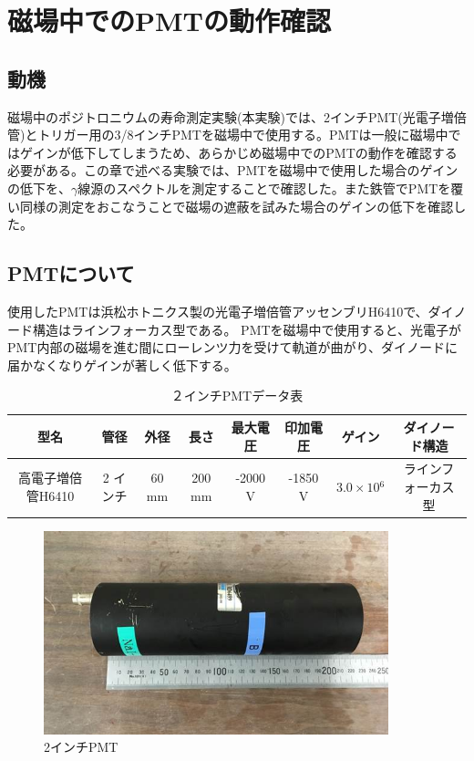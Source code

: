 \chapter{磁場中でのPMTの動作確認}\label{PMT}

\section{動機}
磁場中のポジトロニウムの寿命測定実験(本実験)では、2インチPMT(光電子増倍管)とトリガー用の3/8インチPMTを磁場中で使用する。PMTは一般に磁場中ではゲインが低下してしまうため、あらかじめ磁場中でのPMTの動作を確認する必要がある。この章で述べる実験では、PMTを磁場中で使用した場合のゲインの低下を、$\gamma$線源のスペクトルを測定することで確認した。また鉄管でPMTを覆い同様の測定をおこなうことで磁場の遮蔽を試みた場合のゲインの低下を確認した。

\section{PMTについて}
使用したPMTは浜松ホトニクス製の光電子増倍管アッセンブリH6410で、ダイノード構造はラインフォーカス型である。
PMTを磁場中で使用すると、光電子がPMT内部の磁場を進む間にローレンツ力を受けて軌道が曲がり、ダイノードに届かなくなりゲインが著しく低下する。
\begin{table}[htb]
	\begin{center}
	
	  \begin{tabular}{|c|c|c|c|c|c|c|c|} \hline
		型名& 管径 & 外径 & 長さ & 最大電圧 & 印加電圧 & ゲイン & ダイノード構造 \\ \hline \hline
		高電子増倍管H6410 & 2 インチ & 60 mm & 200 mm & -2000 V & -1850 V & $3.0\times10{^{6}}$ &ラインフォーカス型 \\ \hline
	\end{tabular}
	  \caption{２インチPMTデータ表}
	\end{center}
\end{table}

\begin{figure}[H]
	\centering
		\includegraphics[width=10cm]{fig/iguchi/PMTphoto.jpg}
	\caption{2インチPMT}
	\label{PMTphoto}
\end{figure}

